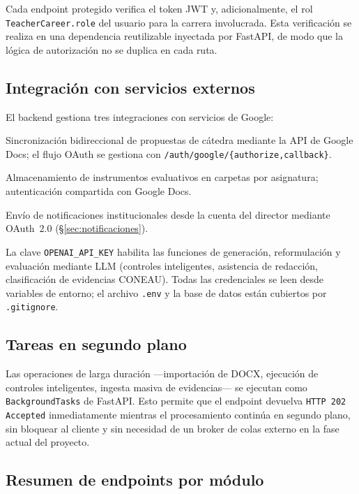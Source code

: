 Cada endpoint protegido verifica el token JWT y, adicionalmente, el rol
\texttt{TeacherCareer.role} del usuario para la carrera involucrada.
Esta verificación se realiza en una dependencia reutilizable inyectada
por FastAPI, de modo que la lógica de autorización no se duplica en cada
ruta.

\subsection{Integración con servicios externos}

El backend gestiona tres integraciones con servicios de Google:
\begin{description}[noitemsep, leftmargin=1.6cm, labelwidth=1.4cm]
  \item[Google Docs] Sincronización bidireccional de propuestas de cátedra
    mediante la API de Google Docs; el flujo OAuth se gestiona con
    \texttt{/auth/google/\{authorize,callback\}}.
  \item[Google Drive] Almacenamiento de instrumentos evaluativos en
    carpetas por asignatura; autenticación compartida con Google Docs.
  \item[Gmail] Envío de notificaciones institucionales desde la cuenta del
    director mediante OAuth~2.0 (\S\ref{sec:notificaciones}).
\end{description}

La clave \texttt{OPENAI\_API\_KEY} habilita las funciones de generación,
reformulación y evaluación mediante LLM (controles inteligentes, asistencia
de redacción, clasificación de evidencias CONEAU).
Todas las credenciales se leen desde variables de entorno; el archivo
\texttt{.env} y la base de datos están cubiertos por \texttt{.gitignore}.

\subsection{Tareas en segundo plano}

Las operaciones de larga duración —importación de DOCX, ejecución de
controles inteligentes, ingesta masiva de evidencias— se ejecutan como
\texttt{BackgroundTasks} de FastAPI.
Esto permite que el endpoint devuelva \texttt{HTTP~202 Accepted}
inmediatamente mientras el procesamiento continúa en segundo plano,
sin bloquear al cliente y sin necesidad de un broker de colas externo
en la fase actual del proyecto.

\subsection{Resumen de endpoints por módulo}

